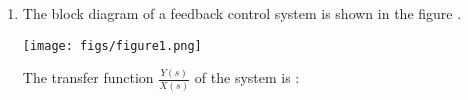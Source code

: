 \begin{enumerate}[label=\thechapter.\arabic*,ref=\thechapter.\theenumi]
\item The block diagram of a feedback control system is shown in the figure .
\begin{center}
\texttt{[image: figs/figure1.png]}
\end{center}
The transfer function $\frac{Y(s)}{X(s)}$ of the system is :
\solution
\end{enumerate}
